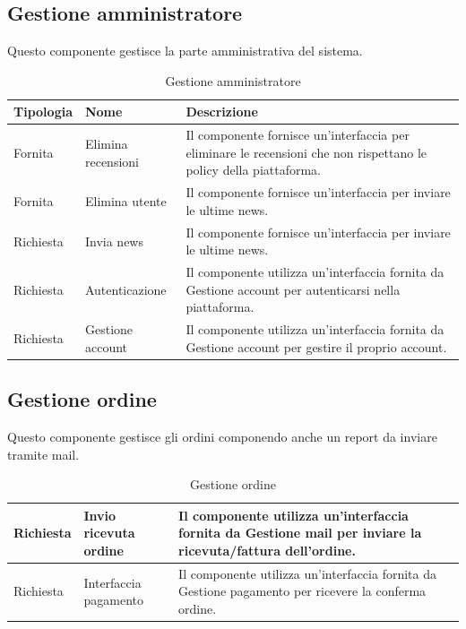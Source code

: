 \subsection{Gestione amministratore}
Questo componente gestisce la parte amministrativa del sistema.

\begin{table}[htbp!]
    \centering
    \begin{tabularx}{0.9\textwidth}{ >{\centering\arraybackslash}X | >{\centering\arraybackslash}X | m{8cm}}
        \hline
        \textbf{Tipologia} & \textbf{Nome}  & \textbf{Descrizione}\\
        \hline
        Fornita & Elimina recensioni & Il componente fornisce un'interfaccia per eliminare le recensioni che non rispettano le policy della piattaforma.\\
        \hline
        Fornita & Elimina utente & Il componente fornisce un'interfaccia per inviare le ultime news.\\
        \hline
        Richiesta & Invia news & Il componente fornisce un'interfaccia per inviare le ultime news.\\
        \hline
        Richiesta &  Autenticazione & Il componente utilizza un'interfaccia fornita da Gestione account per autenticarsi nella piattaforma.\\
        \hline        
        Richiesta &  Gestione account & Il componente utilizza un'interfaccia fornita da Gestione account per gestire il proprio account.\\
        \hline
    \end{tabularx}
    \caption{Gestione amministratore}
    \label{tab:gestione-amministratore}
\end{table}


\newpage
\subsection{Gestione ordine}
Questo componente gestisce gli ordini componendo anche un report da inviare tramite mail.

\begin{table}[htbp!]
    \centering
    \begin{tabularx}{0.9\textwidth}{ >{\centering\arraybackslash}X | >{\centering\arraybackslash}X | m{8cm}}
        \hline
        Richiesta &  Invio ricevuta ordine & Il componente utilizza un'interfaccia fornita da Gestione mail per inviare la ricevuta/fattura dell'ordine.\\
        \hline   
        Richiesta &  Interfaccia pagamento & Il componente utilizza un'interfaccia fornita da Gestione pagamento per ricevere la conferma ordine.\\
        \hline  
    \end{tabularx}
    \caption{Gestione ordine}
    \label{tab:gestione-ordine}
\end{table}


